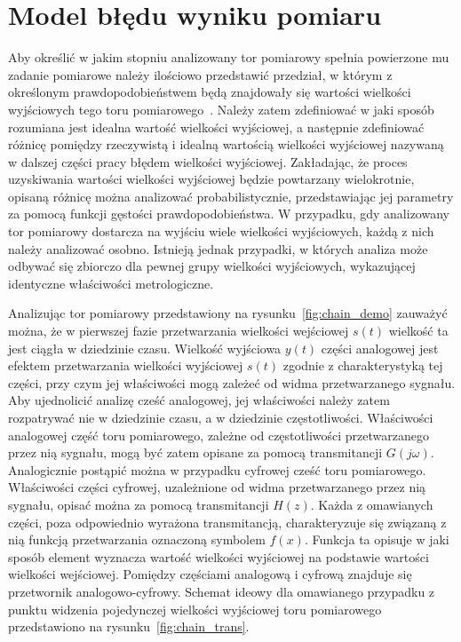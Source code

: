 \chapter{Model błędu wyniku pomiaru}

Aby określić w jakim stopniu analizowany tor pomiarowy spełnia powierzone mu zadanie pomiarowe należy ilościowo przedstawić przedział, w którym z określonym prawdopodobieństwem będą znajdowały się wartości wielkości wyjściowych tego toru pomiarowego~\cite{jcgm_guide}. Należy zatem zdefiniować w jaki sposób rozumiana jest idealna wartość wielkości wyjściowej, a następnie zdefiniować różnicę pomiędzy rzeczywistą i idealną wartością wielkości wyjściowej nazywaną w dalszej części pracy błędem wielkości wyjściowej. Zakładając, że proces uzyskiwania wartości wielkości wyjściowej będzie powtarzany wielokrotnie, opisaną różnicę można analizować probabilistycznie, przedstawiając jej parametry za pomocą funkcji gęstości prawdopodobieństwa. W przypadku, gdy analizowany tor pomiarowy dostarcza na wyjściu wiele wielkości wyjściowych, każdą z nich należy analizować osobno. Istnieją jednak przypadki, w których analiza może odbywać się zbiorczo dla pewnej grupy wielkości wyjściowych, wykazującej identyczne właściwości metrologiczne.

Analizując tor pomiarowy przedstawiony na rysunku~\ref{fig:chain_demo} zauważyć można, że w pierwszej fazie przetwarzania wielkości wejściowej $s(t)$ wielkość ta jest ciągła w dziedzinie czasu. Wielkość wyjściowa $y(t)$ części analogowej jest efektem przetwarzania wielkości wyjściowej $s(t)$ zgodnie z charakterystyką tej części, przy czym jej właściwości mogą zależeć od widma przetwarzanego sygnału. Aby ujednolicić analizę cześć analogowej, jej właściwości należy zatem rozpatrywać nie w dziedzinie czasu, a w dziedzinie częstotliwości. Właściwości analogowej część toru pomiarowego, zależne od częstotliwości przetwarzanego przez nią sygnału, mogą być zatem opisane za pomocą transmitancji $G(j\omega)$. Analogicznie postąpić można w przypadku cyfrowej cześć toru pomiarowego. Właściwości części cyfrowej, uzależnione od widma przetwarzanego przez nią sygnału, opisać można za pomocą transmitancji $H(z)$. Każda z omawianych części, poza odpowiednio wyrażona transmitancją, charakteryzuje się związaną z nią funkcją przetwarzania oznaczoną symbolem $f(x)$. Funkcja ta opisuje w jaki sposób element wyznacza wartość wielkości wyjściowej na podstawie wartości wielkości wejściowej. Pomiędzy częściami analogową i cyfrową znajduje się przetwornik analogowo-cyfrowy. Schemat ideowy dla omawianego przypadku z punktu widzenia pojedynczej wielkości wyjściowej toru pomiarowego przedstawiono na rysunku~\ref{fig:chain_trans}.

